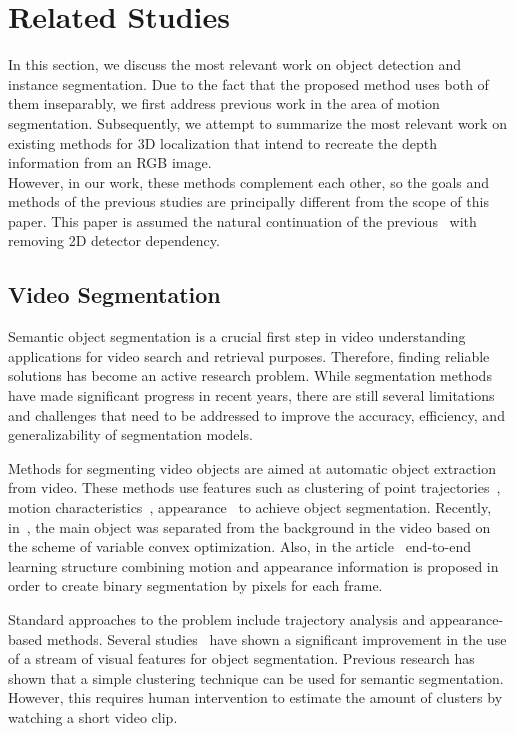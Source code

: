\documentclass[graybox]{svmult}
\begin{document}
\section{Related Studies}
In this section, we discuss the most relevant work on object detection and instance segmentation.
Due to the fact that the proposed  method uses both of them inseparably, we first address previous work in the area of motion segmentation.  Subsequently, we attempt to summarize the most relevant work on existing methods for 3D localization that intend to recreate the depth information from an RGB image.\\
However, in our work, these methods complement each other, so the goals and methods of the previous studies are principally different from the scope of this paper. This paper is assumed the natural continuation of the previous~\cite{lift} with removing 2D detector dependency. 
\subsection{Video Segmentation}
Semantic object segmentation is a crucial first step in video understanding  applications for video search and retrieval purposes. 
Therefore, finding reliable solutions has become an active research problem.
While segmentation methods have made significant progress in recent years, there are still several limitations and challenges that need to be addressed to improve the accuracy, efficiency, and generalizability of segmentation models.

Methods for segmenting video objects are aimed at
automatic object extraction from video. These
methods use features such as clustering of point trajectories~\cite{segm_trajec,segm_tracing}, motion characteristics~\cite{segm_visual}, appearance~\cite{segm_key,segm_graph} to achieve object segmentation.
Recently, in~\cite{segm_prim}, the main object was separated from the background in the video based on the scheme of variable convex optimization.
Also, in the article~\cite{segm_fusion}  end-to-end learning structure
combining motion and appearance information is proposed in order to create
binary segmentation by pixels for each frame.

Standard approaches to the problem include trajectory analysis and appearance-based methods. Several studies~\cite{segm_chain,segm_clust} have shown a significant improvement in the use of a stream of visual features for object segmentation.
Previous research has shown that a simple clustering technique can be used for semantic segmentation. However, this
requires human intervention to estimate the amount of
clusters by watching a short video clip.
\end{document}
